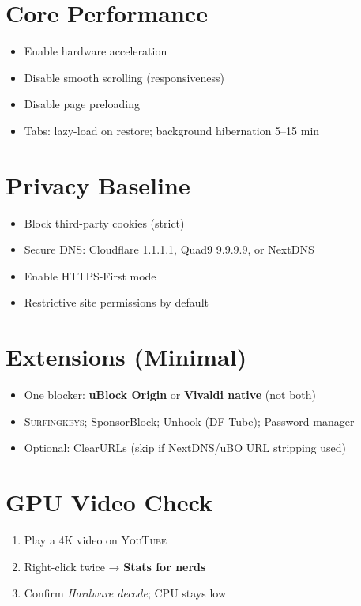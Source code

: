 \documentclass[10pt,a4paper,oneside]{book}
\newcommand{\youtube}{\textsc{YouTube}}
\newcommand{\surfingkeys}{\textsc{Surfingkeys}}
\newcommand{\menupath}[1]{\textbf{\color{textlight}#1}}
\begin{document}
\section{Core Performance}
\begin{itemize}
  \item Enable hardware acceleration
  \item Disable smooth scrolling (responsiveness)
  \item Disable page preloading
  \item Tabs: lazy-load on restore; background hibernation 5–15 min
\end{itemize}

\section{Privacy Baseline}
\begin{itemize}
  \item Block third-party cookies (strict)
  \item Secure DNS: Cloudflare 1.1.1.1, Quad9 9.9.9.9, or NextDNS
  \item Enable HTTPS-First mode
  \item Restrictive site permissions by default
\end{itemize}

\section{Extensions (Minimal)}
\begin{itemize}
  \item One blocker: \textbf{uBlock Origin} or \textbf{Vivaldi native} (not both)
  \item \surfingkeys{}; SponsorBlock; Unhook (DF Tube); Password manager
  \item Optional: ClearURLs (skip if NextDNS/uBO URL stripping used)
\end{itemize}

\section{GPU Video Check}
\begin{enumerate}
  \item Play a 4K video on \youtube{}
  \item Right-click twice → \menupath{Stats for nerds}
  \item Confirm \textit{Hardware decode}; CPU stays low
\end{enumerate}
\end{document}
